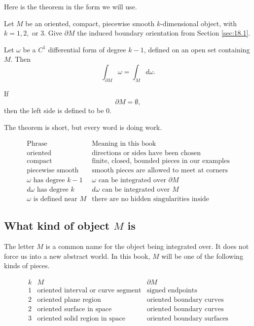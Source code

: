 Here is the theorem in the form we will use.

\begin{theorem}
Let \(M\) be an oriented, compact, piecewise smooth \(k\)-dimensional object, with
\(k=1,2,\) or \(3\).  Give \(\partial M\) the induced boundary orientation from
Section \ref{sec:18.1}.

Let \(\omega\) be a \(C^1\) differential form of degree \(k-1\), defined on an open set
containing \(M\).  Then
\[
\boxed{
    \int_{\partial M}\omega=\int_M d\omega.
}
\]

If
\[
    \partial M=\emptyset,
\]
then the left side is defined to be \(0\).
\end{theorem}

The theorem is short, but every word is doing work.

\[
\begin{array}{c|c}
\text{Phrase} & \text{Meaning in this book} \\ \hline
\text{oriented} & \text{directions or sides have been chosen}\\[1mm]
\text{compact} & \text{finite, closed, bounded pieces in our examples}\\[1mm]
\text{piecewise smooth} & \text{smooth pieces are allowed to meet at corners}\\[1mm]
\omega\text{ has degree }k-1 & \omega\text{ can be integrated over }\partial M\\[1mm]
d\omega\text{ has degree }k & d\omega\text{ can be integrated over }M\\[1mm]
\omega\text{ is defined near }M & \text{there are no hidden singularities inside}
\end{array}
\]

\subsection{What kind of object \(M\) is}

The letter \(M\) is a common name for the object being integrated over.  It does not
force us into a new abstract world.  In this book, \(M\) will be one of the following
kinds of pieces.

\[
\begin{array}{c|c|c}
k & M & \partial M \\ \hline
1 &
\text{oriented interval or curve segment} &
\text{signed endpoints}
\\[1mm]
2 &
\text{oriented plane region} &
\text{oriented boundary curves}
\\[1mm]
2 &
\text{oriented surface in space} &
\text{oriented boundary curves}
\\[1mm]
3 &
\text{oriented solid region in space} &
\text{oriented boundary surfaces}
\end{array}
\]

